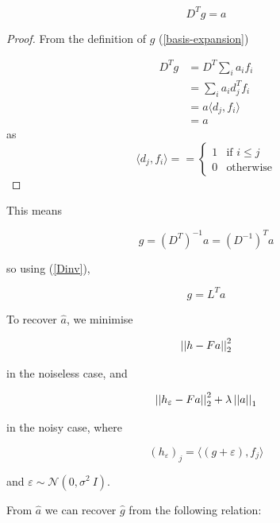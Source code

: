\documentclass{article}
\begin{document}
\begin{theorem}
\begin{equation}
D^Tg = a
\end{equation}
\end{theorem}
\begin{proof}
From the definition of \(g\) (\ref{basis-expansion})

\begin{align}
D^Tg &= D^T \sum_i a_i f_i \\
&= \sum_i a_i d_j^T f_i \\
&= a \langle d_j, f_i\rangle \\
&= a
\end{align}
as
\begin{equation}
\langle d_j, f_i \rangle = =
\begin{cases}
1 & \text{if } i \leq j \\
0 & \text{otherwise} 
\end{cases}
\end{equation}
\end{proof}

This means 

\begin{equation}
g = \left(D^T\right)^{-1} a =\left(D^{-1}\right)^T a
\end{equation}

so using (\ref{Dinv}), 

\begin{equation}
g = L^T a
\end{equation}

To recover \(\hat{a}\), we minimise

\begin{equation}
\left|\left|h - Fa\right|\right|_2^2
\end{equation}

in the noiseless case, and

\begin{equation}
\left|\left|h_\varepsilon - Fa\right|\right|_2^2 + \lambda\left|\left|a\right|\right|_1
\label{recon}
\end{equation}

in the noisy case, where 

\begin{equation}
\left(h_\varepsilon\right)_j = \langle\left(g+\varepsilon\right), f_j\rangle
\end{equation}

and \(\varepsilon \sim \mathcal{N}(0,\sigma^2\ I)\).

From \(\hat{a}\) we can recover \(\hat{g}\) from the following relation:
\end{document}
